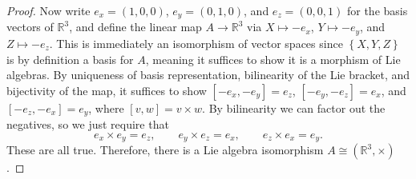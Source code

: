 \documentclass[11pt, letterpaper]{article}
\begin{document}
\begin{proof}
	Now write $e_x=(1,0,0)$, $e_y=(0,1,0)$, and $e_z=(0,0,1)$ for the basis vectors of $\mathbb{R} ^3$, and define the linear map $A\to \mathbb{R} ^3$ via $X\mapsto -e_x$, $Y\mapsto -e_y$, and $Z\mapsto -e_z$. This is immediately an isomorphism of vector spaces since $\left\{ X,Y,Z \right\} $ is by definition a basis for $A$, meaning it suffices to show it is a morphism of Lie algebras. By uniqueness of basis representation, bilinearity of the Lie bracket, and bijectivity of the map, it suffices to show $[-e_x,-e_y]=e_z$, $[-e_y,-e_z]=e_x$, and $[-e_z,-e_x]=e_y$, where $[v,w]=v\times w$. By bilinearity we can factor out the negatives, so we just require that
	\[
		e_x\times e_y=e_z,\qquad e_y\times e_z=e_x,\qquad e_z\times e_x=e_y
	.\]
	These are all true. Therefore, there is a Lie algebra isomorphism $A \cong (\mathbb{R} ^3,\times )$.
\end{proof}
\end{document}
